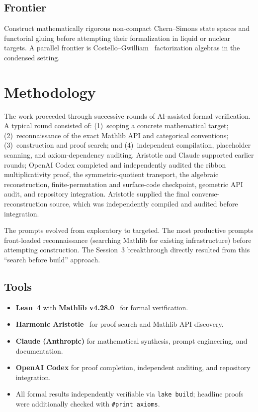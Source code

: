 \documentclass[11pt]{amsart}
\theoremstyle{plain}
\theoremstyle{definition}
\begin{document}
\subsection{Frontier}
Construct mathematically rigorous non-compact Chern--Simons state spaces and functorial gluing before attempting their formalization in liquid or nuclear targets. A parallel frontier is Costello--Gwilliam~\cite{CostelloGwilliam2017} factorization algebras in the condensed setting.

\section{Methodology}
\label{sec:methodology}

The work proceeded through successive rounds of AI-assisted formal verification. A typical round consisted of: (1)~scoping a concrete mathematical target; (2)~reconnaissance of the exact Mathlib API and categorical conventions; (3)~construction and proof search; and (4)~independent compilation, placeholder scanning, and axiom-dependency auditing. Aristotle and Claude supported earlier rounds; OpenAI Codex completed and independently audited the ribbon multiplicativity proof, the symmetric-quotient transport, the algebraic reconstruction, finite-permutation and surface-code checkpoint, geometric API audit, and repository integration. Aristotle supplied the final converse-reconstruction source, which was independently compiled and audited before integration.

The prompts evolved from exploratory to targeted. The most productive prompts front-loaded reconnaissance (searching Mathlib for existing infrastructure) before attempting construction. The Session~3 breakthrough directly resulted from this ``search before build'' approach.

\subsection{Tools}
\begin{itemize}
\item \textbf{Lean~4} with \textbf{Mathlib v4.28.0}~\cite{Mathlib} for formal verification.
\item \textbf{Harmonic Aristotle}~\cite{Aristotle2025} for proof search and Mathlib API discovery.
\item \textbf{Claude (Anthropic)} for mathematical synthesis, prompt engineering, and documentation.
\item \textbf{OpenAI Codex} for proof completion, independent auditing, and repository integration.
\item All formal results independently verifiable via \texttt{lake build}; headline proofs were additionally checked with \texttt{\#print axioms}.
\end{itemize}
\end{document}
